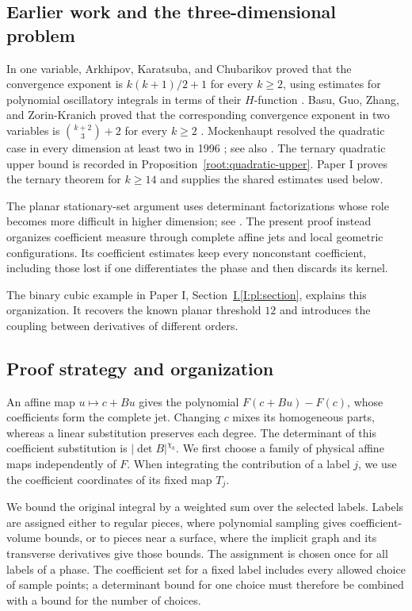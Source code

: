 \documentclass[11pt]{amsart}
\theoremstyle{definition}
\theoremstyle{remark}
\numberwithin{equation}{section}
\newcommand{\partIref}[1]{\hyperref[I:#1]{I.\ref*{I:#1}}}
\begin{document}
\subsection{Earlier work and the three-dimensional problem}\label{intro:earlier}

In one variable, Arkhipov, Karatsuba, and Chubarikov proved that the convergence exponent is $k(k+1)/2+1$ for every $k\ge2$, using estimates for polynomial oscillatory integrals in terms of their $H$-function \cite[Theorems 1 and 5]{AKC80}. Basu, Guo, Zhang, and Zorin-Kranich proved that the corresponding convergence exponent in two variables is $\binom{k+2}{3}+2$ for every $k\ge2$ \cite[Theorem 1.2]{BGZZK}. Mockenhaupt resolved the quadratic case in every dimension at least two in 1996 \cite{Moc96}; see also \cite[Section 1.3]{BGZZK}. The ternary quadratic upper bound is recorded in Proposition~\ref{root:quadratic-upper}. Paper I \cite{PaperI} proves the ternary theorem for $k\ge14$ and supplies the shared estimates used below.

The planar stationary-set argument uses determinant factorizations whose role becomes more difficult in higher dimension; see \cite[Remark 5.11]{BGZZK}. The present proof instead organizes coefficient measure through complete affine jets and local geometric configurations. Its coefficient estimates keep every nonconstant coefficient, including those lost if one differentiates the phase and then discards its kernel.

The binary cubic example in Paper I, Section~\partIref{pl:section}, explains this organization. It recovers the known planar threshold $12$ and introduces the coupling between derivatives of different orders.

\subsection{Proof strategy and organization}\label{intro:strategy}

An affine map $u\mapsto c+Bu$ gives the polynomial $F(c+Bu)-F(c)$, whose coefficients form the complete jet. Changing $c$ mixes its homogeneous parts, whereas a linear substitution preserves each degree. The determinant of this coefficient substitution is $|\det B|^{\chi_k}$. We first choose a family of physical affine maps independently of $F$. When integrating the contribution of a label $j$, we use the coefficient coordinates of its fixed map $T_j$.

We bound the original integral by a weighted sum over the selected labels. Labels are assigned either to regular pieces, where polynomial sampling gives coefficient-volume bounds, or to pieces near a surface, where the implicit graph and its transverse derivatives give those bounds. The assignment is chosen once for all labels of a phase. The coefficient set for a fixed label includes every allowed choice of sample points; a determinant bound for one choice must therefore be combined with a bound for the number of choices.
\end{document}
